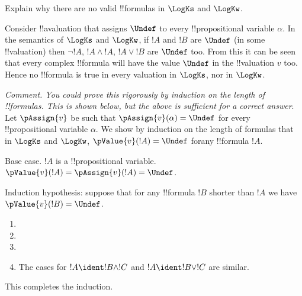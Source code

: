 \documentclass[../../../../include/open-logic-section]{subfiles}
\begin{document}
\begin{prob}
Explain why there are no valid !!{formula}s in $\LogKs$ and $\LogKw$.
\begin{ans}
Consider !!a{valuation} that assigns $\Undef$ to every !!{propositional
variable} $\alpha$. In the semantics of $\LogKs$ and $\LogKw$, 
if $!A$ and $!B$ are $\Undef$ (in some !!{valuation}) then 
$\lnot !A$, $!A \land !A$, $!A \lor !B$
are $\Undef$ too. From this it can be seen that every complex !!{formula}
will have the value $\Undef$ in the !!{valuation} $v$ too. Hence no 
!!{formula} is true in every valuation in $\LogKs$, nor in $\LogKw$. 

\emph{Comment. You could prove this rigorously by induction on the
length of !!{formula}s. This is shown below, but the above is sufficient
for a correct answer}. Let $\pAssign{v}$ be such that $\pAssign{v}(\alpha)
= \Undef$ for every !!{propositional variable} $\alpha$. We show by
induction on the length of formulas that in $\LogKs$ and $\LogKw$,
 $\pValue{v}(!A)=\Undef$ forany !!{formula} $!A$.

Base case. $!A$ is a !!{propositional variable}. $\pValue{v}(!A)=
\pAssign{v}(!A)=\Undef$.

Induction hypothesis: suppose that for any !!{formula} $!B$ shorter than 
$!A$ we have $\pValue{v}(!B)=\Undef$.

\begin{enumerate}
	\item {}
	\item {}
	\item {}
	\item The cases for $!A\ident !B \land !C$ and $!A\ident !B \lor !C$
	are similar.
\end{enumerate}
This completes the induction. 
\end{ans}
\end{prob}
\end{document}
